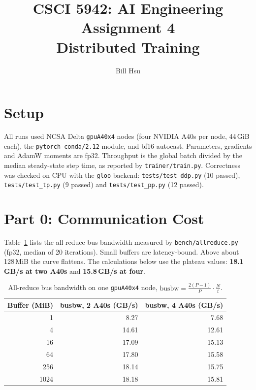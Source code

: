 \documentclass[10pt]{article}
\begin{document}
\title{CSCI 5942: AI Engineering Assignment 4\\Distributed Training}
\author{Bill Hsu}
\maketitle

\section*{Setup}

All runs used NCSA Delta \texttt{gpuA40x4} nodes (four NVIDIA A40s per
node, 44\,GiB each), the \texttt{pytorch-conda/2.12} module, and bf16
autocast. Parameters, gradients and AdamW moments are fp32. Throughput is
the global batch divided by the median steady-state step time, as reported
by \texttt{trainer/train.py}. Correctness was checked on CPU with the
\texttt{gloo} backend: \texttt{tests/test\_ddp.py} (10 passed),
\texttt{tests/test\_tp.py} (9 passed) and \texttt{tests/test\_pp.py}
(12 passed).

\section{Part 0: Communication Cost}

Table~\ref{tab:busbw} lists the all-reduce bus bandwidth measured by
\texttt{bench/allreduce.py} (fp32, median of 20 iterations). Small buffers
are latency-bound. Above about 128\,MiB the curve flattens. The
calculations below use the plateau values: \textbf{18.1\,GB/s at two A40s}
and \textbf{15.8\,GB/s at four}.

\begin{table}[htbp]
\caption{All-reduce bus bandwidth on one \texttt{gpuA40x4} node,
$\text{busbw} = \frac{2(P-1)}{P}\cdot\frac{N}{t}$.}
\label{tab:busbw}
\centering
\begin{tabular}{rrr}
\toprule
Buffer (MiB) & busbw, 2 A40s (GB/s) & busbw, 4 A40s (GB/s) \\
\midrule
1    & 8.27  & 7.68  \\
4    & 14.61 & 12.61 \\
16   & 17.09 & 15.13 \\
64   & 17.80 & 15.58 \\
256  & 18.14 & 15.75 \\
1024 & 18.18 & 15.81 \\
\bottomrule
\end{tabular}
\end{table}
\end{document}
